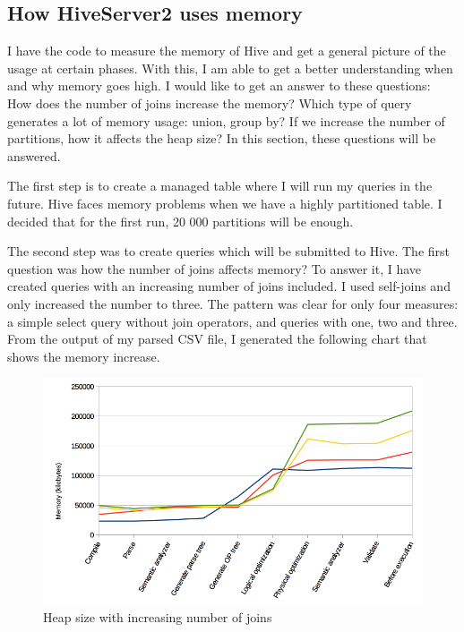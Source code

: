 \subsection{How HiveServer2 uses memory}
I have the code to measure the memory of Hive and get a general picture of the usage at certain phases. With this, I am able to get a better understanding when and why memory goes high. I would like to get an answer to these questions: How does the number of joins increase the memory? Which type of query generates a lot of memory usage: union, group by? If we increase the number of partitions, how it affects the heap size? In this section, these questions will be answered.

The first step is to create a managed table where I will run my queries in the future. Hive faces memory problems when we have a highly partitioned table. I decided that for the first run, 20 000 partitions will be enough. 

The second step was to create queries which will be submitted to Hive. The first question was how the number of joins affects memory? To answer it, I have created queries with an increasing number of joins included. I used self-joins and only increased the number to three. The pattern was clear for only four measures: a simple select query without join operators, and queries with one, two and three. From the output of my parsed CSV file, I generated the following chart that shows the memory increase.

\begin{figure}[H]
	\includegraphics[width=150mm, keepaspectratio]{figures/hs2_joins_memory.png}
	\centering
	\caption{Heap size with increasing number of joins}
\end{figure}

